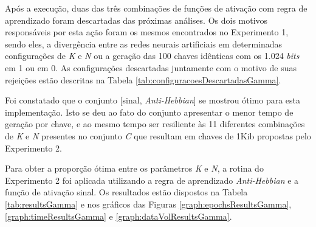 \documentclass[12pt]{article}
\newcommand{\bits}{\textit{bits}\xspace}
\begin{document}
                Após a execução, duas das três combinações de funções de ativação com regra de aprendizado foram descartadas das próximas análises. Os dois motivos responsáveis por esta ação foram os mesmos encontrados no Experimento 1, sendo eles, a divergência entre as redes neurais artificiais em determinadas configurações de \textit{K} e \textit{N} ou a geração das 100 chaves idênticas com os 1.024 \bits em 1 ou em 0. As configurações descartadas juntamente com o motivo de suas rejeições estão descritas na Tabela \ref{tab:configuracoesDescartadasGamma}.
                
                
                
                Foi constatado que o conjunto [sinal, \textit{Anti-Hebbian}] se mostrou ótimo para esta implementação. Isto se deu ao fato do conjunto apresentar o menor tempo de geração por chave, e ao mesmo tempo ser resiliente às 11 diferentes combinações de \textit{K} e \textit{N} presentes no conjunto \textit{C} que resultam em chaves de 1Kib propostas pelo Experimento 2.
                
                Para obter a proporção ótima entre os parâmetros \textit{K} e \textit{N}, a rotina do Experimento 2 foi aplicada utilizando a regra de aprendizado \textit{Anti-Hebbian} e a função de ativação sinal. Os resultados estão dispostos na Tabela \ref{tab:resultsGamma} e nos gráficos das Figuras \ref{graph:epochsResultsGamma}, \ref{graph:timeResultsGamma} e \ref{graph:dataVolResultsGamma}.
                
                
                
                
                
                
                
                
\end{document}
